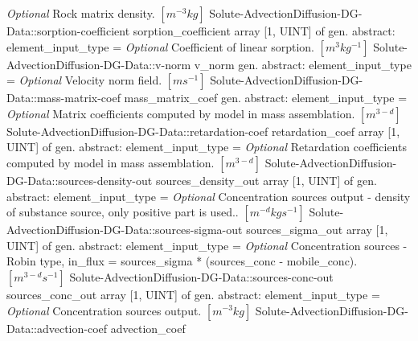 \begin{RecordType}
			{ \it{Optional}}
			{{{Rock matrix density. }{$[m^{-3}kg]$}%
}}
		\RecKey
			{Solute-AdvectionDiffusion-DG-Data::sorption-coefficient}
			{sorption{\_}coefficient}
			{{array [1, UINT] of }{gen. abstract: }}{{element{\_}input{\_}type}{ = }}
			{ \it{Optional}}
			{{{Coefficient of linear sorption. }{$[m^{3}kg^{-1}]$}%
}}
		\RecKey
			{Solute-AdvectionDiffusion-DG-Data::v-norm}
			{v{\_}norm}
			{{gen. abstract: }}{{element{\_}input{\_}type}{ = }}
			{ \it{Optional}}
			{{{Velocity norm field. }{$[ms^{-1}]$}%
}}
		\RecKey
			{Solute-AdvectionDiffusion-DG-Data::mass-matrix-coef}
			{mass{\_}matrix{\_}coef}
			{{gen. abstract: }}{{element{\_}input{\_}type}{ = }}
			{ \it{Optional}}
			{{{Matrix coefficients computed by model in mass assemblation. }{$[m^{3-d}]$}%
}}
		\RecKey
			{Solute-AdvectionDiffusion-DG-Data::retardation-coef}
			{retardation{\_}coef}
			{{array [1, UINT] of }{gen. abstract: }}{{element{\_}input{\_}type}{ = }}
			{ \it{Optional}}
			{{{Retardation coefficients computed by model in mass assemblation. }{$[m^{3-d}]$}%
}}
		\RecKey
			{Solute-AdvectionDiffusion-DG-Data::sources-density-out}
			{sources{\_}density{\_}out}
			{{array [1, UINT] of }{gen. abstract: }}{{element{\_}input{\_}type}{ = }}
			{ \it{Optional}}
			{{{Concentration sources output - density of substance source, only positive part is used.. }{$[m^{-d}kgs^{-1}]$}%
}}
		\RecKey
			{Solute-AdvectionDiffusion-DG-Data::sources-sigma-out}
			{sources{\_}sigma{\_}out}
			{{array [1, UINT] of }{gen. abstract: }}{{element{\_}input{\_}type}{ = }}
			{ \it{Optional}}
			{{{Concentration sources - Robin type, in{\_}flux = sources{\_}sigma * (sources{\_}conc - mobile{\_}conc). }{$[m^{3-d}s^{-1}]$}%
}}
		\RecKey
			{Solute-AdvectionDiffusion-DG-Data::sources-conc-out}
			{sources{\_}conc{\_}out}
			{{array [1, UINT] of }{gen. abstract: }}{{element{\_}input{\_}type}{ = }}
			{ \it{Optional}}
			{{{Concentration sources output. }{$[m^{-3}kg]$}%
}}
		\RecKey
			{Solute-AdvectionDiffusion-DG-Data::advection-coef}
			{advection{\_}coef}

\end{RecordType}
